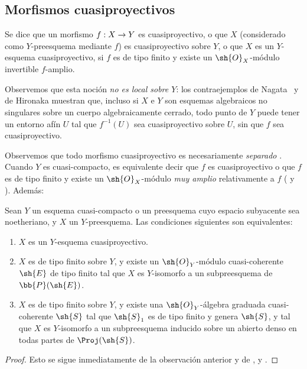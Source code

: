 \documentclass[oneside,10pt]{amsart}
\makeatletter
\newcommand{\ega@arrow}[2]{\mathchoice{#1}{#2}{#2}{#2}}
\renewcommand{\to}{\ega@arrow{\longrightarrow}{\rightarrow}}
\let\EGAOriginalLabel\label
\renewcommand{\label}[1]{\phantomsection\EGAOriginalLabel{#1}}
\makeatother
\begin{document}
\subsection{Morfismos cuasiproyectivos}
\label{subsection:II.5.3}

\begin{definition}[5.3.1]
\label{II.5.3.1}
Se dice que un morfismo $f:X\to Y$ es cuasiproyectivo, o que $X$ (considerado como $Y$-preesquema mediante $f$) es cuasiproyectivo sobre $Y$, o que $X$ es un $Y$-esquema cuasiproyectivo, si $f$ es de tipo finito y existe un $\sh{O}_X$-módulo invertible $f$-amplio.
\end{definition}

Observemos que esta noción \emph{no es local sobre $Y$}:
los contraejemplos de Nagata~\cite{II-26} y de Hironaka muestran que, incluso si $X$ e $Y$ son esquemas algebraicos no singulares sobre un cuerpo algebraicamente cerrado, todo punto de $Y$ puede tener un entorno afín $U$ tal que $f^{-1}(U)$ sea cuasiproyectivo sobre $U$, sin que $f$ sea cuasiproyectivo.

Observemos que todo morfismo cuasiproyectivo es necesariamente \emph{separado} .
Cuando $Y$ es cuasi-compacto, es equivalente decir que $f$ es cuasiproyectivo o que $f$ es de tipo finito y existe un $\sh{O}_X$-módulo \emph{muy amplio} relativamente a $f$ ( y ).
Además:

\begin{proposition}[5.3.2]
\label{II.5.3.2}
Sean $Y$ un esquema cuasi-compacto o un preesquema cuyo espacio subyacente sea noetheriano, y $X$ un $Y$-preesquema.
Las condiciones siguientes son equivalentes:
\begin{enumerate}
  \item[{\rm(a)}] $X$ es un $Y$-esquema cuasiproyectivo.
  \item[{\rm(b)}] $X$ es de tipo finito sobre $Y$, y existe un $\sh{O}_Y$-módulo cuasi-coherente $\sh{E}$ de tipo finito tal que $X$ es $Y$-isomorfo a un subpreesquema de $\bb{P}(\sh{E})$.
  \item[{\rm(c)}] $X$ es de tipo finito sobre $Y$, y existe una $\sh{O}_Y$-álgebra graduada cuasi-coherente $\sh{S}$ tal que $\sh{S}_1$ es de tipo finito y genera $\sh{S}$, y tal que $X$ es $Y$-isomorfo a un subpreesquema inducido sobre un abierto denso en todas partes de $\Proj(\sh{S})$.
\end{enumerate}
\end{proposition}

\begin{proof}
Esto se sigue inmediatamente de la observación anterior y de ,  y .
\end{proof}
\end{document}
